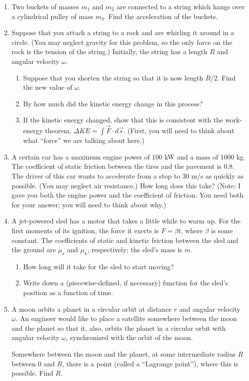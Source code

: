 \documentclass[12pt]{article}
\begin{document}
\begin{enumerate}
\item Two buckets of masses $m_1$ and $m_2$ are connected to a string which hangs over a cylindrical pulley of mass $m_3$. Find the acceleration of the buckets.

\item Suppose that you attach a string to a rock and are whirling it around in a circle. (You may neglect gravity for this problem, so the only force on the rock is the tension of the string.)
Initially, the string has a length $R$ and angular velocity $\omega$.
\begin{enumerate}
\item Suppose that you shorten the string so that it is now length $R/2$. Find the new value of $\omega$.
\item By how much did the kinetic energy change in this process?
\item If the kinetic energy changed, show that this is consistent with the work-energy theorem, $\Delta KE = \int \vec F \cdot d\vec s$. (First, you will need to think about what ``force'' we are talking about here.)
\end{enumerate}

\item A certain car has a maximum engine power of 100 kW and a mass of 1000 kg. The coefficient of static friction between the tires and the pavement is 0.8. The driver of this car wants to accelerate from a stop to 
30 m/s as quickly as possible. (You may neglect air resistance.) How long does this take? (Note: I gave you both the engine power and the coefficient of friction. You need both for your answer; you will need to think about why.)

\item A jet-powered sled has a motor that takes a little while to warm up. For the first moments of its ignition, the force it exerts is $F=\beta t$, where $\beta$ is some constant. The coefficients of static and kinetic
friction between the sled and the ground are $\mu_s$ and $\mu_k$, respectively; the sled's mass is $m$. 

\begin{enumerate}
\item How long will it take for the sled to start moving?
\item Write down a (piecewise-defined, if necessary) function for the sled's position as a function of time. 
\end{enumerate}

\item A moon orbits a planet in a circular orbit at distance $r$ and angular velocity $\omega$. An engineer would like to place a satellite somewhere between the moon and the planet so that it, 
also, orbits the planet in a circular orbit with angular velocity $\omega$, synchronized with the orbit of the moon. 

Somewhere between the moon and the planet, at some intermediate radius $R$ between 0 and $R$, there is a point (called a ``Lagrange point''), where this is possible. Find $R$. 

\end{enumerate}
\end{document}
